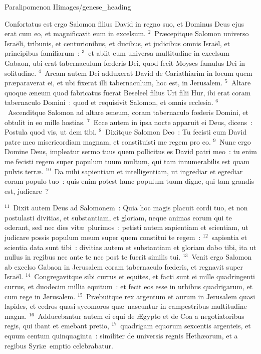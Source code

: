 {Paralipomenon II}{images/genese_heading}


\bchapter
\lettrine[lines=6,image=true,loversize=0.05,lraise=-0.03]{C}{}onfortatus est ergo Salomon filius David in regno suo, et Dominus Deus ejus erat cum eo, et magnificavit eum in excelsum.
${}^{2}$~Pr\ae cepitque Salomon universo Isra\"eli, tribunis, et centurionibus, et ducibus, et judicibus omnis Isra\"el, et principibus familiarum~:
${}^{3}$~et abiit cum universa multitudine in excelsum Gabaon, ubi erat tabernaculum fœderis Dei, quod fecit Moyses famulus Dei in solitudine.
${}^{4}$~Arcam autem Dei adduxerat David de Cariathiarim in locum quem pr\ae paraverat ei, et ubi fixerat illi tabernaculum, hoc est, in Jerusalem.
${}^{5}$~Altare quoque \ae neum quod fabricatus fuerat Beseleel filius Uri filii Hur, ibi erat coram tabernaculo Domini~: quod et requisivit Salomon, et omnis ecclesia.
${}^{6}$~Ascenditque Salomon ad altare \ae neum, coram tabernaculo fœderis Domini, et obtulit in eo mille hostias.
${}^{7}$~Ecce autem in ipsa nocte apparuit ei Deus, dicens~: Postula quod vis, ut dem tibi.
${}^{8}$~Dixitque Salomon Deo~: Tu fecisti cum David patre meo misericordiam magnam, et constituisti me regem pro eo.
${}^{9}$~Nunc ergo Domine Deus, impleatur sermo tuus quem pollicitus es David patri meo~: tu enim me fecisti regem super populum tuum multum, qui tam innumerabilis est quam pulvis terr\ae .
${}^{10}$~Da mihi sapientiam et intelligentiam, ut ingrediar et egrediar coram populo tuo~: quis enim potest hunc populum tuum digne, qui tam grandis est, judicare~?


${}^{11}$~Dixit autem Deus ad Salomonem~: Quia hoc magis placuit cordi tuo, et non postulasti divitias, et substantiam, et gloriam, neque animas eorum qui te oderant, sed nec dies vit\ae\ plurimos~: petisti autem sapientiam et scientiam, ut judicare possis populum meum super quem constitui te regem~:
${}^{12}$~sapientia et scientia data sunt tibi~: divitias autem et substantiam et gloriam dabo tibi, ita ut nullus in regibus nec ante te nec post te fuerit similis tui.
${}^{13}$~Venit ergo Salomon ab excelso Gabaon in Jerusalem coram tabernaculo fœderis, et regnavit super Isra\"el.
${}^{14}$~Congregavitque sibi currus et equites, et facti sunt ei mille quadringenti currus, et duodecim millia equitum~: et fecit eos esse in urbibus quadrigarum, et cum rege in Jerusalem.
${}^{15}$~Pr\ae buitque rex argentum et aurum in Jerusalem quasi lapides, et cedros quasi sycomoros qu\ae\ nascuntur in campestribus multitudine magna.
${}^{16}$~Adducebantur autem ei equi de \AE gypto et de Coa a negotiatoribus regis, qui ibant et emebant pretio,
${}^{17}$~quadrigam equorum sexcentis argenteis, et equum centum quinquaginta~: similiter de universis regnis Heth\ae orum, et a regibus Syri\ae\ emptio celebrabatur.

